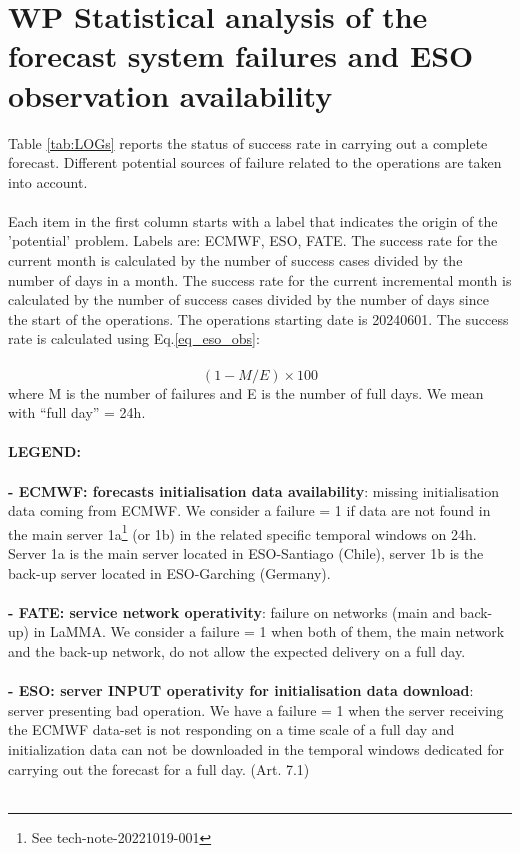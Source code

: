 \section{WP Statistical analysis of the forecast system failures and ESO observation availability}
\label{sect:2}

Table \ref{tab:LOGs} reports the status of success rate in carrying out a complete forecast. Different potential sources of failure related to the operations are taken into account. \\ \\
\noindent
Each item in the first column starts with a label that indicates the origin of the 'potential' problem. Labels are: ECMWF, ESO, FATE. The success rate for the current month is calculated by the number of success cases divided by the number of days in a month. The success rate for the current incremental month is calculated by the number of success cases divided by the number of days since the start of the operations.
The operations starting date is 20240601. The success rate is calculated using Eq.\ref{eq_eso_obs}:\\  \\
\begin{equation}
(1-M/E)\times 100
\label{eq_eso_obs}
\end{equation}
where M is the number of failures and E is the number of full days. We mean with ``full day'' = 24h.\\ \\ 
\noindent
{\bf LEGEND:}\\ \\
\noindent
{\bf - ECMWF: forecasts initialisation data availability}: missing initialisation data coming from ECMWF.  We consider a failure = 1 if data are not found in the main server 1a\footnote{See tech-note-20221019-001} (or 1b) in the related specific temporal windows on 24h. Server 1a is the main server located in ESO-Santiago (Chile), server 1b is the back-up server located in ESO-Garching (Germany). \\ \\
\noindent
{\bf - FATE: service network operativity}:  failure on networks (main and back-up) in LaMMA. We consider a failure = 1 when both of them, the main network and the back-up network, do not allow the expected delivery on a full day. \\ \\
\noindent
{\bf - ESO: server INPUT operativity for initialisation data download}: server presenting bad operation. We have a failure = 1 when the server receiving the ECMWF data-set is not responding on a time scale of a full day and initialization data can not be downloaded in the temporal windows dedicated for carrying out the forecast for a full day. (Art. 7.1) \\ \\ 
